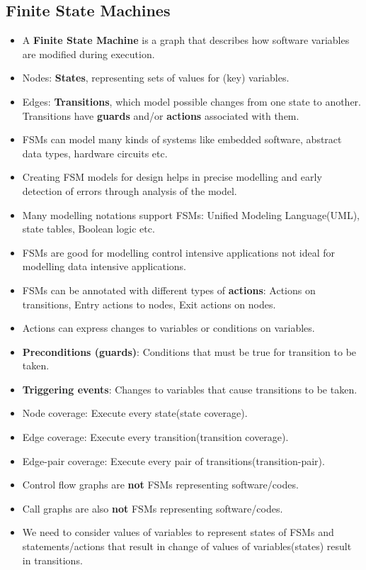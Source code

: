 \documentclass[a4paper]{article}
\begin{document}
\subsection{Finite State Machines}
\begin{itemize}
    \item A \textbf{Finite State Machine} is a graph that describes how software variables are modified during execution.
    \item Nodes: \textbf{States}, representing sets of values for (key) variables.
    \item Edges: \textbf{Transitions}, which model possible changes from one state to another. Transitions have \textbf{guards} and/or \textbf{actions} associated with them.
    \item FSMs can model many kinds of systems like embedded software, abstract data types, hardware circuits etc.
    \item Creating FSM models for design helps in precise modelling and early detection of errors through analysis of the model.
    \item Many modelling notations support FSMs: Unified Modeling Language(UML), state tables, Boolean logic etc.
    \item FSMs are good for modelling control intensive applications not ideal for modelling data intensive applications.
    \item FSMs can be annotated with different types of \textbf{actions}: Actions on transitions, Entry actions to nodes, Exit actions on nodes.
    \item Actions can express changes to variables or conditions on variables.
    \item \textbf{Preconditions (guards)}: Conditions that must be true for transition to be taken.
    \item \textbf{Triggering events}: Changes to variables that cause transitions to be taken.
    \item Node coverage: Execute every state(state coverage).
    \item Edge coverage: Execute every transition(transition coverage).
    \item Edge-pair coverage: Execute every pair of transitions(transition-pair).
    \item Control flow graphs are \textbf{not} FSMs representing software/codes.
    \item Call graphs are also \textbf{not} FSMs representing software/codes.
    \item We need to consider values of variables to represent states of FSMs and statements/actions that result in change of values of variables(states) result in transitions.
\end{itemize}
\end{document}
